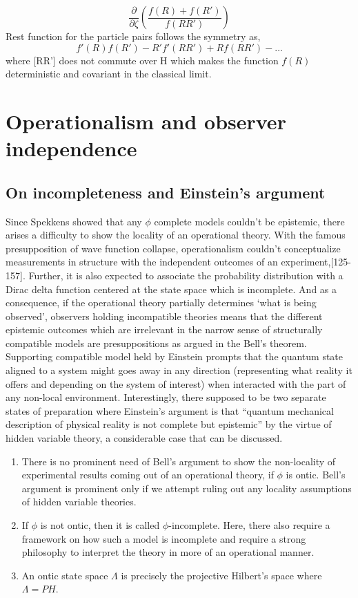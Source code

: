 \documentclass{article}
\begin{document}
 \begin{equation}
      \frac{\partial}{\partial \zeta} (\frac{f(R) +f(R')}{f(RR')} )
 \end{equation} Rest function for the particle pairs follows the symmetry as, \begin{equation}
  f'(R) f(R') - R'f'(RR') + Rf(RR') - \dots 
 \end{equation} where [RR’] does not commute over H which makes the function $f(R)$ deterministic and covariant in the classical limit. \section{Operationalism and observer independence}
 \subsection{On incompleteness and Einstein's argument}
 Since Spekkens showed that any $\phi$ complete models couldn't be epistemic, there arises a difficulty to show the locality of an operational theory. With the famous presupposition of wave function collapse, operationalism couldn't conceptualize measurements in structure with the independent outcomes of an experiment\cite{24},[125-157]. Further, it is also expected to associate the probability distribution with a Dirac delta function centered at the state space which is incomplete. And as a consequence, if the operational theory partially determines ‘what is being observed’, observers holding incompatible theories means that the different epistemic outcomes which are irrelevant in the narrow sense of structurally compatible models are presuppositions as argued in the Bell's theorem. Supporting compatible model held by Einstein prompts that the quantum state aligned to a system might goes away in any direction (representing what reality it offers and depending on the system of interest) when interacted with the part of any non-local environment. Interestingly, there supposed to be two separate states of preparation where Einstein’s argument is that “quantum mechanical description of physical reality is not complete\cite{25} but epistemic” by the virtue of hidden variable theory, a considerable case that can be discussed.
\begin{enumerate}
\item There is no prominent need of Bell’s argument to show the non-locality of experimental results coming out of an operational theory, if $\phi$ is ontic. Bell’s argument is prominent only if we attempt ruling out any locality assumptions of hidden variable theories.
\item If $\phi$ is not ontic, then it is called $\phi$-incomplete. Here, there also require a framework on how such a model is incomplete and require a strong philosophy to interpret the theory in more of an operational manner.
\item An ontic state space $\Lambda$ is precisely the projective Hilbert’s space where $\Lambda = PH$.
\end{enumerate}
\end{document}
